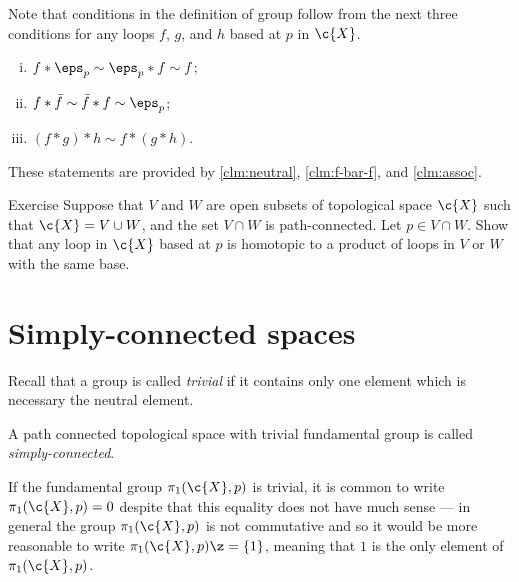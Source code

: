 Note that conditions in the definition of group follow from the next three conditions for any loops $f$, $g$, and $h$ based at $p$ in $\c{X}$.
\begin{enumerate}[(i)]
\item $f*\eps_p\sim \eps_p*f\sim f$;
\item $f*\bar f\sim\bar f* f\sim \eps_p$;
\item $(f*g)*h\sim f*(g*h)$.
\end{enumerate}
These statements are provided by \ref{clm:neutral}, \ref{clm:f-bar-f}, and \ref{clm:assoc}.
\qeds

\begin{thm}{Exercise}
Suppose that $V$ and $W$ are open subsets of topological space $\c{X}$ such that 
$\c{X}=V\cup W$, and the set $V\cap W$ is path-connected.
Let $p\in V\cap W$.
Show that any loop in $\c{X}$ based at $p$  is homotopic to a product of loops in $V$ or $W$ with the same base.
\end{thm}

\section{Simply-connected spaces}

Recall that a group is called \emph{trivial} if it contains only one element which is necessary the neutral element.

A path connected topological space with trivial fundamental group is called \emph{simply-connected}.

If the fundamental group $\pi_1(\c{X},p)$ is trivial, it is common to write $\pi_1(\c{X},p)=0$ despite that this equality does not have much sense --- in general the group $\pi_1(\c{X},p)$ is not commutative and so it would be more reasonable to write $\pi_1(\c{X},p)\z=\{1\}$, meaning that $1$ is the only element of $\pi_1(\c{X},p)$.



